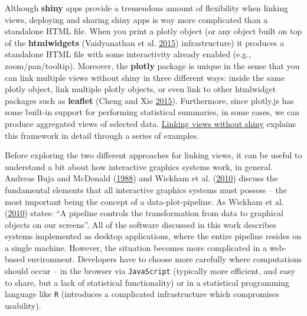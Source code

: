 \documentclass[12pt,]{isuthesis}
\begin{document}
Although \textbf{shiny} apps provide a tremendous amount of flexibility
when linking views, deploying and sharing shiny apps is way more
complicated than a standalone HTML file. When you print a plotly object
(or any object built on top of the \textbf{htmlwidgets} (Vaidyanathan et
al. \protect\hyperlink{ref-htmlwidgets}{2015}) infrastructure) it
produces a standalone HTML file with some interactivity already enabled
(e.g., zoom/pan/tooltip). Moreover, the \textbf{plotly} package is
unique in the sense that you can link multiple views without shiny in
three different ways: inside the same plotly object, link multiple
plotly objects, or even link to other htmlwidget packages such as
\textbf{leaflet} (Cheng and Xie \protect\hyperlink{ref-leaflet}{2015}).
Furthermore, since plotly.js has some built-in support for performing
statistical summaries, in some cases, we can produce aggregated views of
selected data. \protect\hyperlink{linking-views-with-shiny}{Linking
views without shiny} explains this framework in detail through a series
of examples.

Before exploring the two different approaches for linking views, it can
be useful to understand a bit about how interactive graphics systems
work, in general. Andreas Buja and McDonald
(\protect\hyperlink{ref-viewing-pipeline}{1988}) and Wickham et al.
(\protect\hyperlink{ref-plumbing}{2010}) discuss the fundamental
elements that all interactive graphics systems must possess -- the most
important being the concept of a data-plot-pipeline. As Wickham et al.
(\protect\hyperlink{ref-plumbing}{2010}) states: ``A pipeline controls
the transformation from data to graphical objects on our screens''. All
of the software discussed in this work describes systems implemented as
desktop applications, where the entire pipeline resides on a single
machine. However, the situation becomes more complicated in a web-based
environment. Developers have to choose more carefully where computations
should occur -- in the browser via \texttt{JavaScript} (typically more
efficient, and easy to share, but a lack of statistical functionality)
or in a statistical programming language like \texttt{R} (introduces a
complicated infrastructure which compromises usability).
\end{document}
